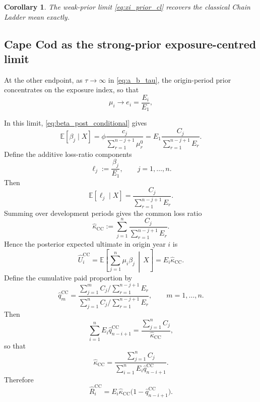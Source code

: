 \documentclass[11pt]{article}
\newtheorem{corollary}[theorem]{Corollary}
\newcommand{\E}{\mathbb{E}}
\newcommand{\1}{\mathbf{1}}
\begin{document}
\begin{corollary}
The weak-prior limit \eqref{eq:xi_prior_cl} recovers the classical Chain Ladder mean exactly.
\end{corollary}


\subsection{Cape Cod as the strong-prior exposure-centred limit}\label{subsec:strong_prior_limit}

At the other endpoint, as $\tau\to\infty$ in \eqref{eq:a_b_tau}, the origin-period prior concentrates on the exposure index, so that
$$
\mu_i \rightarrow e_i=\frac{E_i}{E_1},
$$


In this limit, \eqref{eq:beta_post_conditional} gives
\begin{equation}
\E[\beta_j\mid X]
=
\phi\frac{c_j}{\sum_{r=1}^{n-j+1} \mu_r^0}
=
E_1\frac{C_j}{\sum_{r=1}^{n-j+1}E_r}.
\label{eq:beta_mean_capecod}
\end{equation}
Define the additive loss-ratio components
\begin{equation}
\ell_j:=\frac{\beta_j}{E_1},
\qquad j=1,\dots,n.
\label{eq:additive_lr_def}
\end{equation}
Then
\begin{equation}
\E[\ell_j\mid X]
=
\frac{C_j}{\sum_{r=1}^{n-j+1}E_r}.
\label{eq:additive_lr_cc}
\end{equation}
Summing over development periods gives the common loss ratio
\begin{equation}
\widehat\kappa_{\mathrm{CC}}
:=
\sum_{j=1}^{n}\frac{C_j}{\sum_{r=1}^{n-j+1}E_r}.
\label{eq:kappa_cc_additive}
\end{equation}
Hence the posterior expected ultimate in origin year $i$ is
\begin{equation}
\widehat U_i^{\mathrm{CC}}
=
\E\!\left[\sum_{j=1}^{n}\mu_i\beta_j\,\middle|\,X\right]
=
E_i\widehat\kappa_{\mathrm{CC}}.
\label{eq:ultimate_cc}
\end{equation}
Define the cumulative paid proportion by
\begin{equation}
\widehat q_m^{\mathrm{CC}}
=
\frac{\sum_{j=1}^{m} C_j\big/\sum_{r=1}^{n-j+1}E_r}
{\sum_{j=1}^{n} C_j\big/\sum_{r=1}^{n-j+1}E_r},
\qquad m=1,\dots,n.
\label{eq:q_cc}
\end{equation}
Then
\begin{equation}
\sum_{i=1}^{n}E_i\widehat q_{n-i+1}^{\mathrm{CC}}
=
\frac{\sum_{j=1}^{n}C_j}{\widehat\kappa_{\mathrm{CC}}},
\label{eq:cc_denominator_identity}
\end{equation}
so that
\begin{equation}
\widehat\kappa_{\mathrm{CC}}
=
\frac{\sum_{j=1}^{n}C_j}{\sum_{i=1}^{n}E_i\widehat q_{n-i+1}^{\mathrm{CC}}}.
\label{eq:kappa_cc_from_beta}
\end{equation}
Therefore
\begin{equation}
\widehat R_i^{\mathrm{CC}}
=
E_i\widehat\kappa_{\mathrm{CC}}\bigl(1-\widehat q_{n-i+1}^{\mathrm{CC}}\bigr).
\label{eq:reserve_cc}
\end{equation}
\end{document}
